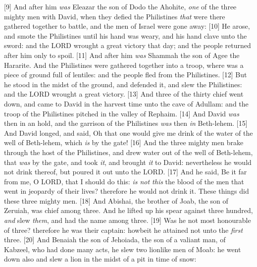[9] \textcolor[rgb]{0.00,0.00,1.00}{And after him \emph{was} Eleazar the son of Dodo the Ahohite, \emph{one} of the three mighty men with David, when they defied the Philistines \emph{that} were there gathered together to battle, and the men of Israel were gone away:}
[10] \textcolor[rgb]{0.00,0.00,1.00}{He arose, and smote the Philistines until his hand was weary, and his hand clave unto the sword: and the LORD wrought a great victory that day; and the people returned after him only to spoil.}
[11] \textcolor[rgb]{0.00,0.00,1.00}{And after him \emph{was} Shammah the son of Agee the Hararite. And the Philistines were gathered together into a troop, where was a piece of ground full of lentiles: and the people fled from the Philistines.}
[12] \textcolor[rgb]{0.00,0.00,1.00}{But he stood in the midst of the ground, and defended it, and slew the Philistines: and the LORD wrought a great victory.}
[13] \textcolor[rgb]{0.00,0.00,1.00}{And three of the thirty chief went down, and came to David in the harvest time unto the cave of Adullam: and the troop of the Philistines pitched in the valley of Rephaim.}
[14] \textcolor[rgb]{0.00,0.00,1.00}{And David \emph{was} then in an hold, and the garrison of the Philistines \emph{was} then \emph{in} Beth-lehem.}
[15] \textcolor[rgb]{0.00,0.00,1.00}{And David longed, and said, Oh that one would give me drink of the water of the well of Beth-lehem, which \emph{is} by the gate!}
[16] \textcolor[rgb]{0.00,0.00,1.00}{And the three mighty men brake through the host of the Philistines, and drew water out of the well of Beth-lehem, that \emph{was} by the gate, and took \emph{it}, and brought \emph{it} to David: nevertheless he would not drink thereof, but poured it out unto the LORD.}
[17] \textcolor[rgb]{0.00,0.00,1.00}{And he said, Be it far from me, O LORD, that I should do this: \emph{is not this} the blood of the men that went in jeopardy of their lives? therefore he would not drink it. These things did these three mighty men.}
[18] \textcolor[rgb]{0.00,0.00,1.00}{And Abishai, the brother of Joab, the son of Zeruiah, was chief among three. And he lifted up his spear against three hundred, \emph{and} slew \emph{them}, and had the name among three.}
[19] \textcolor[rgb]{0.00,0.00,1.00}{Was he not most honourable of three? therefore he was their captain: howbeit he attained not unto the \emph{first} three.}
[20] \textcolor[rgb]{0.00,0.00,1.00}{And Benaiah the son of Jehoiada, the son of a valiant man, of Kabzeel, who had done many acts, he slew two lionlike men of Moab: he went down also and slew a lion in the midst of a pit in time of snow:}
